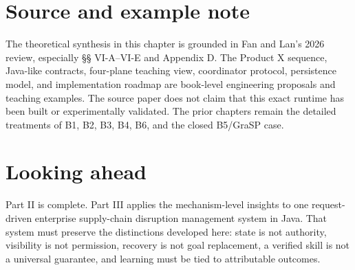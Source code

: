 \section*{Source and example note}
The theoretical synthesis in this chapter is grounded in Fan and Lan's 2026 review, especially §§ VI-A--VI-E and Appendix D. The Product X sequence, Java-like contracts, four-plane teaching view, coordinator protocol, persistence model, and implementation roadmap are book-level engineering proposals and teaching examples. The source paper does not claim that this exact runtime has been built or experimentally validated. The prior chapters remain the detailed treatments of B1, B2, B3, B4, B6, and the closed B5/GraSP case.

\section*{Looking ahead}
Part II is complete. Part III applies the mechanism-level insights to one request-driven enterprise supply-chain disruption management system in Java. That system must preserve the distinctions developed here: state is not authority, visibility is not permission, recovery is not goal replacement, a verified skill is not a universal guarantee, and learning must be tied to attributable outcomes.

